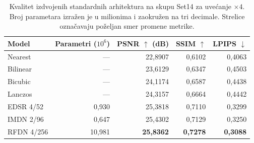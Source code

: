 \begin{table}[H]
    \centering
    \caption{Kvalitet izdvojenih standardnih arhitektura na skupu Set14 za uvećanje $\times4$. Broj parametara izražen je u milionima i zaokružen na tri decimale. Strelice označavaju poželjan smer promene metrike.}
    \label{tab:results_4x_Set14}
    \begingroup
    \small
    \setlength{\tabcolsep}{4pt}
    \renewcommand{\arraystretch}{1.15}
    \begin{tabular}{@{}lrrrr@{}}
        \toprule
        Model & \shortstack{Parametri\\($10^6$)} & \shortstack{PSNR $\uparrow$\\(dB)} & SSIM $\uparrow$ & LPIPS $\downarrow$ \\
        \midrule
        Nearest & --- & 22,8907 & 0,6102 & 0,4063 \\
        Bilinear & --- & 23,6129 & 0,6347 & 0,4503 \\
        Bicubic & --- & 24,1174 & 0,6587 & 0,4438 \\
        Lanczos & --- & 24,3157 & 0,6664 & 0,4442 \\
        \midrule
        EDSR 4/52 & 0,930 & 25,3818 & 0,7110 & 0,3299 \\
        IMDN 2/96 & 0,647 & 25,4302 & 0,7129 & 0,3250 \\
        RFDN 4/256 & 10,981 & \textbf{25,8362} & \textbf{0,7278} & \textbf{0,3088} \\
        \bottomrule
    \end{tabular}
    \endgroup
\end{table}